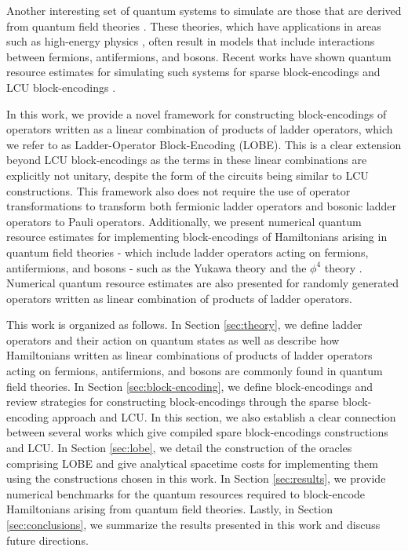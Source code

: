 Another interesting set of quantum systems to simulate are those that are derived from quantum field theories \cite{Peskin:1995ev, jordan2012quantum} .
These theories, which have applications in areas such as high-energy physics \cite{bauer2023quantum}, often result in models that include interactions between fermions, antifermions, and bosons.
Recent works have shown quantum resource estimates for simulating such systems for sparse block-encodings \cite{camps2024explicit, liu2024efficient} and LCU block-encodings \cite{rhodes2024exponential}.

In this work, we provide a novel framework for constructing block-encodings of operators written as a linear combination of products of ladder operators, which we refer to as Ladder-Operator Block-Encoding (LOBE).
This is a clear extension beyond LCU block-encodings as the terms in these linear combinations are explicitly not unitary, despite the form of the circuits being similar to LCU constructions.
This framework also does not require the use of operator transformations to transform both fermionic ladder operators \cite{jordan1928paulische, bravyi2002fermionic,seeley2012bravyi} and bosonic ladder operators \cite{somma2005quantum} to Pauli operators.
Additionally, we present numerical quantum resource estimates for implementing block-encodings of Hamiltonians arising in quantum field theories - which include ladder operators acting on fermions, antifermions, and bosons - such as the Yukawa theory \cite{Peskin:1995ev} and the $\phi^4$ theory \cite{}.
Numerical quantum resource estimates are also presented for randomly generated operators written as linear combination of products of ladder operators.

This work is organized as follows.
In Section \ref{sec:theory}, we define ladder operators and their action on quantum states as well as describe how Hamiltonians written as linear combinations of products of ladder operators acting on fermions, antifermions, and bosons are commonly found in quantum field theories.
In Section \ref{sec:block-encoding}, we define block-encodings and review strategies for constructing block-encodings through the sparse block-encoding approach and LCU.
In this section, we also establish a clear connection between several works which give compiled spare block-encodings constructions \cite{camps2024explicit,liu2024efficient} and LCU.
In Section \ref{sec:lobe}, we detail the construction of the oracles comprising LOBE and give analytical spacetime costs for implementing them using the constructions chosen in this work.
In Section \ref{sec:results}, we provide numerical benchmarks for the quantum resources required to block-encode Hamiltonians arising from quantum field theories. 
Lastly, in Section \ref{sec:conclusions}, we summarize the results presented in this work and discuss future directions.
